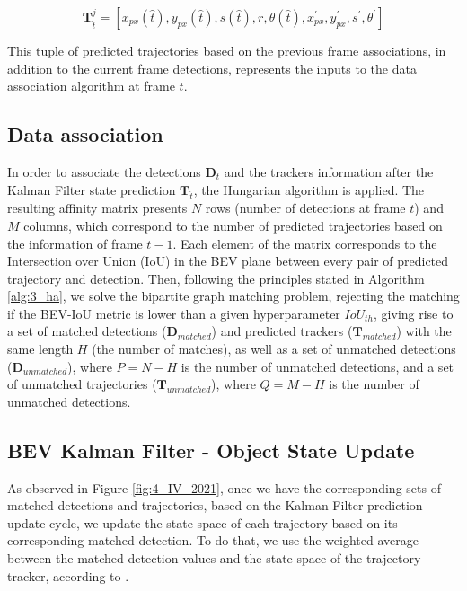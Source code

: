 \begin{equation}
	\label{est}
	\textbf{T}_{\hat{t}}^{j} = [x_{px}(\hat{t}),y_{px}(\hat{t}),s(\hat{t}),r,\theta(\hat{t}),x_{px}^{'},y_{px}^{'},s^{'},\theta^{'}]
\end{equation}

This tuple of predicted trajectories based on the previous frame associations, in addition to the current frame detections, represents the inputs to the data association algorithm at frame $t$.

\subsection{Data association}

In order to associate the detections $\textbf{D}_{t}$ and the trackers information after the Kalman Filter state prediction $\textbf{T}_{\hat{t}}$, the Hungarian algorithm is applied. The resulting affinity matrix presents $N$ rows (number of detections at frame $t$) and $M$ columns, which correspond to the number of predicted trajectories based on the information of frame $t-1$. Each element of the matrix corresponds to the Intersection over Union (IoU) in the \ac{BEV} plane between every pair of predicted trajectory and detection. Then, following the principles stated in Algorithm \ref{alg:3_ha}, we solve the bipartite graph matching problem, rejecting the matching if the BEV-IoU metric is lower than a given hyperparameter $IoU_{th}$, giving rise to a set of matched detections ($\textbf{D}_{matched}$) and predicted trackers ($\textbf{T}_{matched}$) with the same length $H$ (the number of matches), as well as a set of unmatched detections ($\textbf{D}_{unmatched}$), where $P = N - H$ is the number of unmatched detections, and a set of unmatched trajectories ($\textbf{T}_{unmatched}$), where $Q = M - H$ is the number of unmatched detections.

\subsection{BEV Kalman Filter - Object State Update}

As observed in Figure \ref{fig:4_IV_2021}, once we have the corresponding sets of matched detections and trajectories, based on the Kalman Filter prediction-update cycle, we update the state space of each trajectory based on its corresponding matched detection. To do that, we use the weighted average between the matched detection values and the state space of the trajectory tracker, according to \cite{kalman1960new}. 

